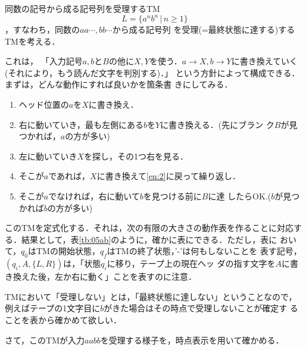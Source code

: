 \begin{myexample}{同数の記号から成る記号列を受理するTM}
 \[
 L = \{a^n b^n \, | \, n \ge 1\}
 \]
 ，すなわち，同数の$aa\cdots , bb \cdots$から成る記号列
 を受理(=最終状態に達する)するTMを考える．

 これは，
 「入力記号$a,b$と$B$の他に$X,Y$を使う．$a \rightarrow X,
 b\rightarrow Y$に書き換えていく(それにより，もう読んだ文字を判別する)．」
 という方針によって構成できる．まずは，どんな動作にすれば良いかを箇条書
 きにしてみる．

 \begin{enumerate}
  \item ヘッド位置の$a$を$X$に書き換え．
  \item 右に動いていき，最も左側にある$b$を$Y$に書き換える．(先にブラン
        ク$B$が見つかれば，$a$の方が多い) \label{en:2}
  \item 左に動いていき$X$を探し，その1つ右を見る．
  \item そこが$a$であれば，$X$に書き換えて\ref{en:2}に戻って繰り返し．
  \item そこが$a$でなければ，右に動いて$b$を見つける前に$B$に達
        したらOK.($b$が見つかれば$b$の方が多い)
 \end{enumerate}

 このTMを定式化する．それは，次の有限の大きさの動作表を作ることに対応す
 る．結果として，表\ref{tb:05ab}のように，確かに表にできる．ただし，表に
 おいて，$q_0$はTMの開始状態，$q_f$はTMの終了状態，'-'は何もしないことを
 表す記号，$(q_i , A, \{L,R\})$は，「状態$q_i$に移り，テープ上の現在ヘッ
 ダの指す文字を$A$に書き換えた後，左か右に動く」ことを表すのに注意．

 TMにおいて「受理しない」とは，「最終状態に達しない」ということなので，
 例えばテープの1文字目に$b$がきた場合はその時点で受理しないことが確定す
 ることを表から確かめて欲しい．

 さて，このTMが入力$aabb$を受理する様子を，時点表示を用いて確かめる．


\end{myexample}
